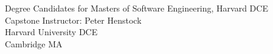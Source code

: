 \begin{titlepage}
    \vfill

    Degree Candidates for Masters of Software Engineering, Harvard DCE\\
    Capstone Instructor: Peter Henstock\\
    Harvard University DCE\\
    Cambridge MA\\
    \date{\today}

    \setlength{\parindent}{\defaultparindent}

\end{titlepage}